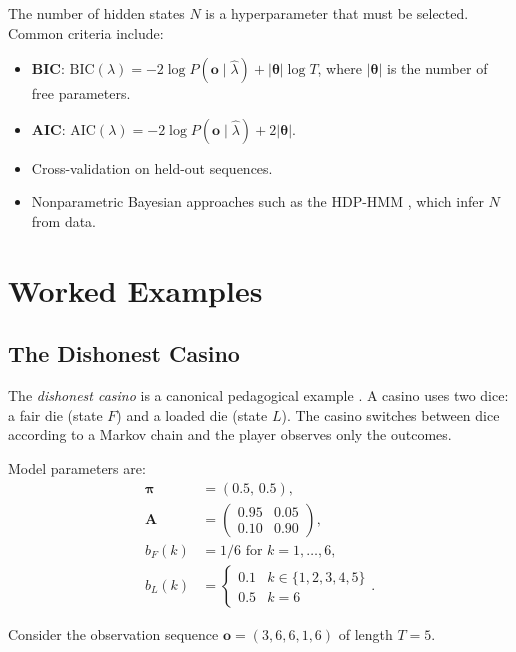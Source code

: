 \documentclass[conference]{IEEEtran}
\begin{document}
The number of hidden states $N$ is a hyperparameter that must be selected. Common criteria include:
\begin{itemize}
  \item \textbf{BIC}: $\text{BIC}(\lambda) = -2\log P(\mathbf{o} \mid \hat{\lambda}) + |\boldsymbol{\theta}| \log T$, where $|\boldsymbol{\theta}|$ is the number of free parameters.
  \item \textbf{AIC}: $\text{AIC}(\lambda) = -2\log P(\mathbf{o} \mid \hat{\lambda}) + 2|\boldsymbol{\theta}|$.
  \item Cross-validation on held-out sequences.
  \item Nonparametric Bayesian approaches such as the HDP-HMM \cite{teh2006hierarchical}, which infer $N$ from data.
\end{itemize}

\section{Worked Examples}
\label{sec:examples}

\subsection{The Dishonest Casino}

The \emph{dishonest casino} is a canonical pedagogical example \cite{durbin1998biological}. A casino uses two dice: a fair die (state $F$) and a loaded die (state $L$). The casino switches between dice according to a Markov chain and the player observes only the outcomes.

Model parameters are:
\begin{align*}
\boldsymbol{\pi} &= (0.5, \, 0.5), \\
\mathbf{A} &= \begin{pmatrix} 0.95 & 0.05 \\ 0.10 & 0.90 \end{pmatrix}, \\
b_F(k) &= 1/6 \text{ for } k = 1, \ldots, 6, \\
b_L(k) &= \begin{cases} 0.1 & k \in \{1,2,3,4,5\} \\ 0.5 & k = 6 \end{cases}.
\end{align*}

Consider the observation sequence $\mathbf{o} = (3, 6, 6, 1, 6)$ of length $T = 5$.
\end{document}
